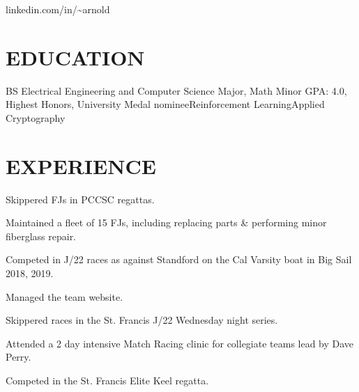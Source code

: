 \documentclass[10pt]{article}
\begin{document}
				 {linkedin.com/in/{\textasciitilde}arnold}

\section*{EDUCATION}

    {BS {\textendash} Electrical Engineering and Computer Science Major, Math Minor}
{GPA: 4.0, Highest Honors, University Medal nominee}{Reinforcement Learning}{Applied Cryptography}


\section*{EXPERIENCE}

              \begin{accomplishments}
                \item Skippered FJs in PCCSC regattas.
                \item Maintained a fleet of 15 FJs, including replacing parts \& performing minor fiberglass repair.
                \item Competed in J/22 races as against Standford on the Cal Varsity boat in Big Sail 2018, 2019.
                \item Managed the team website.
               \end{accomplishments}

              \begin{accomplishments}
                \item Skippered races in the St. Francis J/22 Wednesday night series.
                \item Attended a 2 day intensive Match Racing clinic for collegiate teams lead by Dave Perry.
              \end{accomplishments}

              \begin{accomplishments}
                \item Competed in the St. Francis Elite Keel regatta.
              \end{accomplishments}
\end{document}
